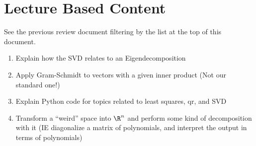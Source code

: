 \documentclass[12pt]{exam}
\begin{document}
\section{Lecture Based Content}
See the previous review document filtering by the list at the top of this document.
\begin{enumerate}
    \item Explain how the SVD relates to an Eigendecomposition
    \item Apply Gram-Schmidt to vectors with a given inner product (Not our standard one!)
    \item Explain Python code for topics related to least squares, qr, and SVD
    \item Transform a ``weird'' space into $\R^n$ and perform some kind of decomposition with it
        (IE diagonalize a matrix of polynomials, and interpret the output in terms of polynomials)
\end{enumerate}
\end{document}
